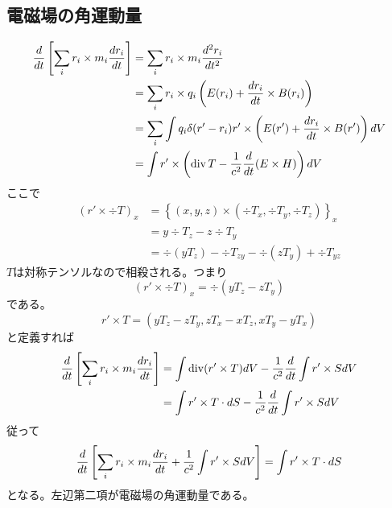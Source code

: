 \subsection{電磁場の角運動量}
    \begin{align*}
        \de{t}\left[\sum_i r_i \times m_i\de[r_i]{t}\right]
            &= \sum_i r_i \times m_i\dd[r_i]{t}\\
            &= \sum_i r_i \times q_i\left(E(r_i) + \de[r_i]{t} \times B(r_i)\right)\\
            &= \sum_i \int q_i\delta(r' - r_i)r' \times \left(E(r') + \de[r_i]{t} \times B(r')\right) dV\\
            &= \int r' \times \left(\div T - \frac{1}{c^2}\de{t}(E \times H)\right) dV
    \end{align*}
    ここで
    \begin{align*}
        (r' \times \div T)_x
            &= \left\{(x, y, z) \times (\div T_x, \div T_y, \div T_z)\right\}_x\\
            &= y\div T_z - z\div T_y\\
            &= \div (yT_z) - \div T_{zy} - \div (zT_y) + \div T_{yz}
    \end{align*}
    $T$は対称テンソルなので相殺される。つまり
        \[(r' \times \div T)_x = \div (yT_z - zT_y)\]
    である。
        \[r' \times T = (yT_z - zT_y, zT_x - xT_z, xT_y - yT_x)\]
    と定義すれば
    \begin{align*}
        \de{t}\left[\sum_i r_i \times m_i\de[r_i]{t}\right]
            &= \int \div(r' \times T) dV - \frac{1}{c^2}\de{t}\int r' \times S dV\\
            &= \int r' \times T \cdot dS - \frac{1}{c^2}\de{t}\int r' \times S dV
    \end{align*}
    従って
        \[\de{t}\left[\sum_i r_i \times m_i\de[r_i]{t} + \frac{1}{c^2}\int r' \times S dV\right] = \int r' \times T \cdot dS\]
    となる。左辺第二項が電磁場の角運動量である。
